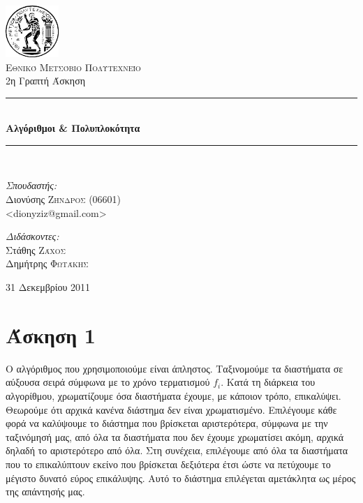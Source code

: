 \documentclass[11pt,a4paper]{book}
\newcommand{\HRule}{\rule{\linewidth}{0.5mm}}
\begin{document}
\begin{titlepage}
\begin{center}

\includegraphics[width=0.15\textwidth]{Pyrforos3.png}\\[1cm]
\textsc{\LARGE Εθνικό Μετσόβιο Πολυτεχνείο}\\[1.5cm]

\Large{ 2η Γραπτή Άσκηση }\\[0.5cm]

\begin{doublespace}
\HRule \\[0.4cm]
{\huge \bfseries
Αλγόριθμοι \& Πολυπλοκότητα
}\\[0.4cm]
\end{doublespace}

\HRule \\[1.5cm]

\begin{minipage}{0.4\textwidth}
\begin{flushleft} \large
\emph{Σπουδαστής:} \\
Διονύσης \textsc{Ζήνδρος} (06601)\\
\textlatin{\textless dionyziz@gmail.com\textgreater}
\end{flushleft}
\end{minipage}
\begin{minipage}{0.4\textwidth}
\begin{flushright} \large
\emph{Διδάσκοντες:} \\
Στάθης \textsc{Ζάχος}\\
Δημήτρης \textsc{Φωτάκης}
\end{flushright}
\end{minipage}

\vfill

{\large 31 Δεκεμβρίου 2011}
\end{center}
\end{titlepage}

\section*{Άσκηση 1}

Ο αλγόριθμος που χρησιμοποιούμε είναι άπληστος. Ταξινομούμε τα διαστήματα σε αύξουσα σειρά σύμφωνα με το χρόνο τερματισμού $f_i$. Κατά τη διάρκεια του αλγορίθμου, χρωματίζουμε όσα διαστήματα έχουμε, με κάποιον τρόπο, επικαλύψει. Θεωρούμε ότι αρχικά κανένα διάστημα δεν είναι χρωματισμένο. Επιλέγουμε κάθε φορά να καλύψουμε το διάστημα που βρίσκεται αριστερότερα, σύμφωνα με την ταξινόμησή μας, από όλα τα διαστήματα που δεν έχουμε χρωματίσει ακόμη, αρχικά δηλαδή το αριστερότερο από όλα. Στη συνέχεια, επιλέγουμε από όλα τα διαστήματα που το επικαλύπτουν εκείνο που βρίσκεται δεξιότερα έτσι ώστε να πετύχουμε το μέγιστο δυνατό εύρος επικάλυψης. Αυτό το διάστημα επιλέγεται αμετάκλητα ως μέρος της απάντησής μας.
\end{document}
